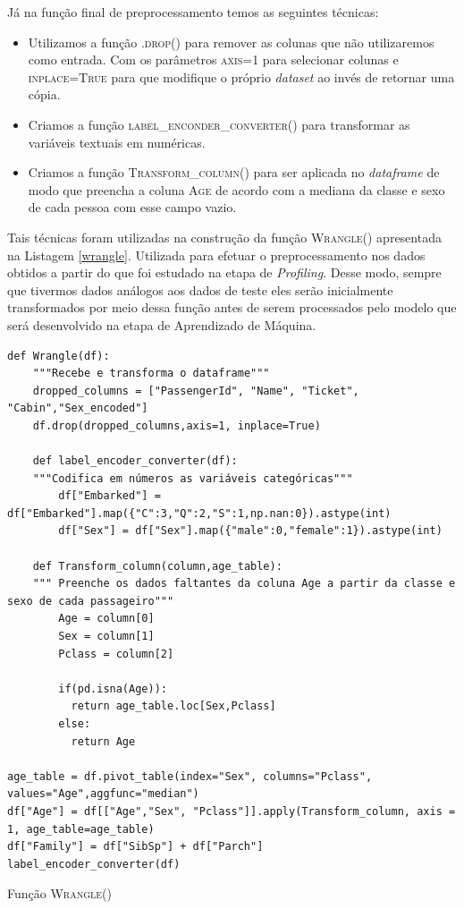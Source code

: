 \documentclass{article}
\begin{document}
Já na função final de preprocessamento temos as seguintes técnicas:
\begin{itemize}
\item Utilizamos a função \textsc{.drop()} para remover as colunas que não utilizaremos como entrada. Com os parâmetros \textsc{axis=1} para selecionar colunas e \textsc{inplace=True} para que modifique o próprio \emph{dataset} ao invés de retornar uma cópia.
\item Criamos a função \textsc{label\_enconder\_converter()} para transformar as variáveis textuais em numéricas. 
\item Criamos a função \textsc{Transform\_column()} para ser aplicada no \emph{dataframe} de modo que preencha a coluna \textsc{Age} de acordo com a mediana da classe e sexo de cada pessoa com esse campo vazio. 
\end{itemize}

Tais técnicas foram utilizadas na construção da função \textsc{Wrangle()} apresentada na Listagem \ref{wrangle}. Utilizada para efetuar o preprocessamento nos dados obtidos a partir do que foi estudado na etapa de \emph{Profiling}. Desse modo, sempre que tivermos dados análogos aos dados de teste eles serão inicialmente transformados por meio dessa função antes de serem processados pelo modelo que será desenvolvido na etapa de Aprendizado de Máquina. 
\begin{listing}[!ht]
\begin{verbatim}
def Wrangle(df):  
    """Recebe e transforma o dataframe"""
    dropped_columns = ["PassengerId", "Name", "Ticket", "Cabin","Sex_encoded"]
    df.drop(dropped_columns,axis=1, inplace=True)

    def label_encoder_converter(df):
    """Codifica em números as variáveis categóricas"""
        df["Embarked"] = df["Embarked"].map({"C":3,"Q":2,"S":1,np.nan:0}).astype(int)
        df["Sex"] = df["Sex"].map({"male":0,"female":1}).astype(int)
        
    def Transform_column(column,age_table):
    """ Preenche os dados faltantes da coluna Age a partir da classe e sexo de cada passageiro"""
        Age = column[0]
        Sex = column[1]
        Pclass = column[2]

        if(pd.isna(Age)):
          return age_table.loc[Sex,Pclass]
        else:
          return Age

age_table = df.pivot_table(index="Sex", columns="Pclass", values="Age",aggfunc="median")  
df["Age"] = df[["Age","Sex", "Pclass"]].apply(Transform_column, axis = 1, age_table=age_table)
df["Family"] = df["SibSp"] + df["Parch"]
label_encoder_converter(df)
\end{verbatim}
\caption{Função \textsc{Wrangle()}}
\label{wrangle}
\end{listing}
\end{document}
